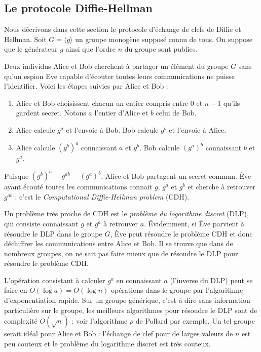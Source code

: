 \documentclass{article}
\theoremstyle{plain}%
\theoremstyle{definition}%
\begin{document}
\subsection{Le protocole Diffie-Hellman}


Nous décrivons dans cette section le protocole d'échange de clefs de Diffie et Hellman. 
Soit $G = \langle g \rangle$ un groupe monogène supposé connu de tous. On suppose que le générateur $g$ ainsi que l'ordre $n$ du groupe sont publics.

Deux individus Alice et Bob cherchent à partager un élément du groupe $G$ sans qu'un espion Eve capable d'écouter toutes leurs communications ne puisse l'identifier. Voici les étapes suivies par Alice et Bob :
\begin{enumerate}
  \item Alice et Bob choisissent chacun un entier compris entre $0$ et $n-1$ qu'ils gardent secret. Notons $a$ l'entier d'Alice et $b$ celui de Bob.
  \item Alice calcule $g^a$ et l'envoie à Bob. Bob calcule $g^b$ et l'envoie à Alice.
  \item Alice calcule $(g^b)^a$ connaissant $a$ et $g^b$. Bob calcule $(g^a)^b$ connaissant $b$ et $g^a$.
\end{enumerate}
Puisque $(g^b)^a = g^{ab} = (g^a)^b$, Alice et Bob partagent un secret commun. Ève ayant écouté toutes les communications connait $g$, $g^a$ et $g^b$ et cherche à retrouver $g^{ab}$ : c'est le \emph{Computational Diffie-Hellman problem} (CDH).

Un problème très proche de CDH est le \emph{problème du logarithme discret} (DLP), qui consiste connaissant $g$ et $g^a$ à retrouver $a$.
Évidemment, si Ève parvient à résoudre le DLP dans le groupe $G$, Ève peut résoudre le problème CDH et donc déchiffrer les communications entre Alice et Bob. Il se trouve que dans de nombreux groupes, on ne sait pas faire mieux que de résoudre le DLP pour résoudre le problème CDH.

L'opération consistant à calculer $g^a$ en connaissant $a$ (l'inverse du DLP) peut se faire en $O(\log a) = O(\log n)$ opérations dans le groupe par l'algorithme d'exponentiation rapide. 
Sur un groupe générique, c'est à dire sans information particulière sur le groupe, les meilleurs algorithmes pour résoudre le DLP sont de complexité $O(\sqrt{n})$ : voir l'algorithme $\rho$ de Pollard par exemple. Un tel groupe serait idéal pour Alice et Bob : l'échange de clef pour de larges valeurs de $n$ est peu couteux et le problème du logarithme discret est très couteux.
\end{document}
